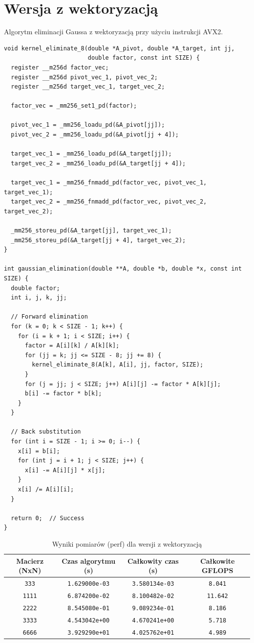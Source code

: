 \documentclass[12pt]{article}
\begin{document}
\section*{Wersja z wektoryzacją}
Algorytm eliminacji Gaussa z wektoryzacją przy użyciu instrukcji AVX2. 
\begin{verbatim}
void kernel_eliminate_8(double *A_pivot, double *A_target, int jj,
                        double factor, const int SIZE) {
  register __m256d factor_vec;
  register __m256d pivot_vec_1, pivot_vec_2;
  register __m256d target_vec_1, target_vec_2;

  factor_vec = _mm256_set1_pd(factor);

  pivot_vec_1 = _mm256_loadu_pd(&A_pivot[jj]);
  pivot_vec_2 = _mm256_loadu_pd(&A_pivot[jj + 4]);

  target_vec_1 = _mm256_loadu_pd(&A_target[jj]);
  target_vec_2 = _mm256_loadu_pd(&A_target[jj + 4]);

  target_vec_1 = _mm256_fnmadd_pd(factor_vec, pivot_vec_1, target_vec_1);
  target_vec_2 = _mm256_fnmadd_pd(factor_vec, pivot_vec_2, target_vec_2);

  _mm256_storeu_pd(&A_target[jj], target_vec_1);
  _mm256_storeu_pd(&A_target[jj + 4], target_vec_2);
}

int gaussian_elimination(double **A, double *b, double *x, const int SIZE) {
  double factor;
  int i, j, k, jj;

  // Forward elimination
  for (k = 0; k < SIZE - 1; k++) {
    for (i = k + 1; i < SIZE; i++) {
      factor = A[i][k] / A[k][k];
      for (jj = k; jj <= SIZE - 8; jj += 8) {
        kernel_eliminate_8(A[k], A[i], jj, factor, SIZE);
      }
      for (j = jj; j < SIZE; j++) A[i][j] -= factor * A[k][j];
      b[i] -= factor * b[k];
    }
  }

  // Back substitution
  for (int i = SIZE - 1; i >= 0; i--) {
    x[i] = b[i];
    for (int j = i + 1; j < SIZE; j++) {
      x[i] -= A[i][j] * x[j];
    }
    x[i] /= A[i][i];
  }

  return 0;  // Success
}
\end{verbatim}

\begin{table}[H]
  \centering
  \begin{tabular}{|c|c|c|c|}
    \hline
    \textbf{Macierz (NxN)} & \textbf{Czas algorytmu (s)} & \textbf{Całkowity czas (s)} & \textbf{Całkowite GFLOPS} \\
    \hline
    \verb|333|  & \verb|1.629000e-03| & \verb|3.580134e-03| & \verb|8.041| \\
    \hline
    \verb|1111| & \verb|6.874200e-02| & \verb|8.100482e-02| & \verb|11.642| \\
    \hline
    \verb|2222| & \verb|8.545080e-01| & \verb|9.089234e-01| & \verb|8.186| \\
    \hline
    \verb|3333| & \verb|4.543042e+00| & \verb|4.670241e+00| & \verb|5.718| \\
    \hline
    \verb|6666| & \verb|3.929290e+01| & \verb|4.025762e+01| & \verb|4.989| \\
    \hline
  \end{tabular}
  \caption{Wyniki pomiarów (perf) dla wersji z wektoryzacją}
\end{table}
\end{document}
